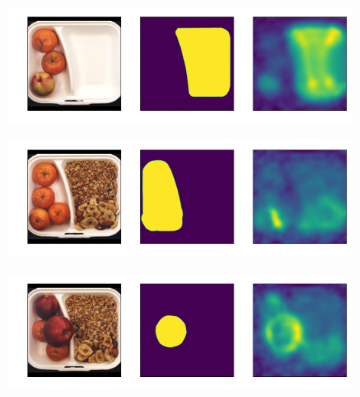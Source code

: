 \begin{figure}[htbp]
    \captionsetup[subfigure]{justification=centering}
    \centering
    \begin{subfigure}[b]{0.3\textwidth}
        \centering

    \end{subfigure}
    \begin{subfigure}[b]{0.3\textwidth}
        \centering
        \includegraphics[width=\textwidth]{figures/locopatchcoreresults/breakfast_box_test_logical_anomalies_034.png}


    \end{subfigure}
    \begin{subfigure}[b]{0.3\textwidth}
        \centering
        \includegraphics[width=\textwidth]{figures/locopatchcoreresults/breakfast_box_test_logical_anomalies_070.png}


    \end{subfigure}
    \begin{subfigure}[b]{0.3\textwidth}
        \centering

    \end{subfigure}
    \begin{subfigure}[b]{0.3\textwidth}
        \centering
        \includegraphics[width=\textwidth]{figures/locopatchcoreresults/breakfast_box_test_structural_anomalies_024.png}



\end{subfigure}
\end{figure}
